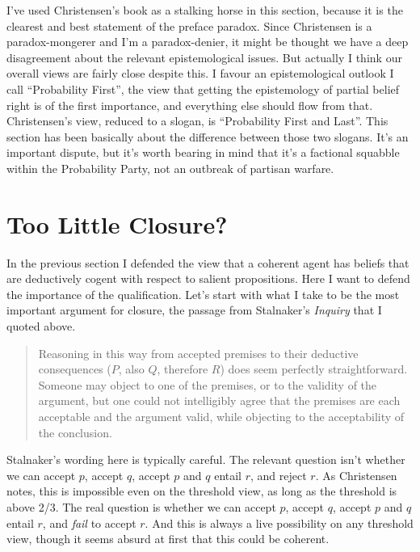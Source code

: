 I've used Christensen's book as a stalking horse in this section, because it is the clearest and best statement of the preface paradox. Since Christensen is a paradox-mongerer and I'm a paradox-denier, it might be thought we have a deep disagreement about the relevant epistemological issues. But actually I think our overall views are fairly close despite this. I favour an epistemological outlook I call ``Probability First'', the view that getting the epistemology of partial belief right is of the first importance, and everything else should flow from that. Christensen's view, reduced to a slogan, is ``Probability First and Last''. This section has been basically about the difference between those two slogans. It's an important dispute, but it's worth bearing in mind that it's a factional squabble within the Probability Party, not an outbreak of partisan warfare.


\section{Too Little Closure?}

In the previous section I defended the view that a coherent agent has beliefs that are deductively cogent with respect to salient propositions. Here I want to defend the importance of the qualification. Let's start with what I take to be the most important argument for closure, the passage from Stalnaker's \textit{Inquiry} that I quoted above.

\begin{quote}
Reasoning in this way from accepted premises to their deductive consequences (\(P\), also \(Q\), therefore \(R\)) does seem perfectly straightforward. Someone may object to one of the premises, or to the validity of the argument, but one could not intelligibly agree that the premises are each acceptable and the argument valid, while objecting to the acceptability of the conclusion. \cite[92]{Stalnaker1984}
\end{quote}

\noindent Stalnaker's wording here is typically careful. The relevant question isn't whether we can accept \(p\), accept \(q\), accept \(p\) and \(q\) entail \(r\), and reject \(r\). As Christensen \citeyearpar[Ch. 4]{Christensen2005} notes, this is impossible even on the threshold view, as long as the threshold is above 2/3. The real question is whether we can accept \(p\), accept \(q\), accept \(p\) and \(q\) entail \(r\), and \textit{fail }to accept \(r\). And this is always a live possibility on any threshold view, though it seems absurd at first that this could be coherent.

